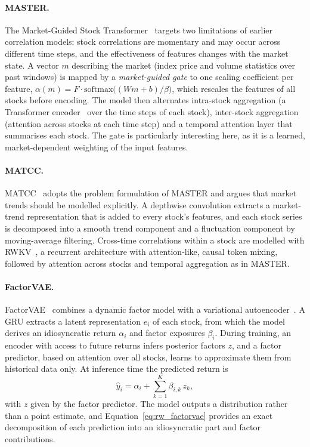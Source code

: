 \paragraph{MASTER.} The Market-Guided Stock Transformer~\cite{li2024master} targets two limitations of earlier correlation models: stock correlations are momentary and may occur across different time steps, and the effectiveness of features changes with the market state. A vector $m$ describing the market (index price and volume statistics over past windows) is mapped by a \emph{market-guided gate} to one scaling coefficient per feature, $\alpha(m) = F \cdot \mathrm{softmax}\big((W m + b)/\beta\big)$, which rescales the features of all stocks before encoding. The model then alternates intra-stock aggregation (a Transformer encoder~\cite{vaswani2017attention} over the time steps of each stock), inter-stock aggregation (attention across stocks at each time step) and a temporal attention layer that summarises each stock. The gate is particularly interesting here, as it is a learned, market-dependent weighting of the input features.

\paragraph{MATCC.} MATCC~\cite{cao2024matcc} adopts the problem formulation of MASTER and argues that market trends should be modelled explicitly. A depthwise convolution extracts a market-trend representation that is added to every stock's features, and each stock series is decomposed into a smooth trend component and a fluctuation component by moving-average filtering. Cross-time correlations within a stock are modelled with RWKV~\cite{peng2023rwkv}, a recurrent architecture with attention-like, causal token mixing, followed by attention across stocks and temporal aggregation as in MASTER.

\paragraph{FactorVAE.} FactorVAE~\cite{duan2022factorvae} combines a dynamic factor model with a variational autoencoder~\cite{kingma2014auto}. A GRU extracts a latent representation $e_i$ of each stock, from which the model derives an idiosyncratic return $\alpha_i$ and factor exposures $\beta_i$. During training, an encoder with access to future returns infers posterior factors $z$, and a factor predictor, based on attention over all stocks, learns to approximate them from historical data only. At inference time the predicted return is
\begin{equation}
    \label{eq:rw_factorvae}
    \hat{y}_i = \alpha_i + \sum_{k=1}^{K} \beta_{i,k}\, z_k ,
\end{equation}
with $z$ given by the factor predictor. The model outputs a distribution rather than a point estimate, and Equation~\ref{eq:rw_factorvae} provides an exact decomposition of each prediction into an idiosyncratic part and factor contributions.


